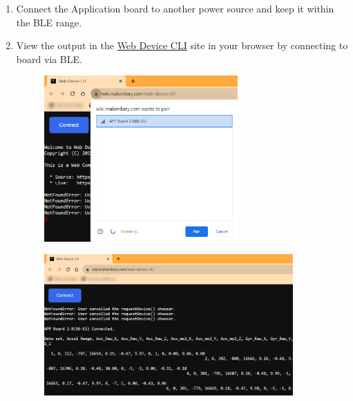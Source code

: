 \documentclass[11pt,headings=small]{scrartcl}
\begin{document}
\begin{enumerate}
	\item Connect the Application board to another power source and keep it within the BLE range.
	\item View the output in the \href{https://wiki.makerdiary.com/web-device-cli/}{Web Device CLI} site in your browser by connecting to board via BLE.
	\begin{figure}[H]
		\begin{center}
			\includegraphics[width=0.7\textwidth]{coinesAPI_images/Mcu_example_ble_pair.png}
		\end{center}
	\end{figure}
	\begin{figure}[H]
		\begin{center}
			\includegraphics[width=0.9\textwidth]{coinesAPI_images/Mcu_example_ble_output.png}
		\end{center}
	\end{figure}
\end{enumerate}
\end{document}
